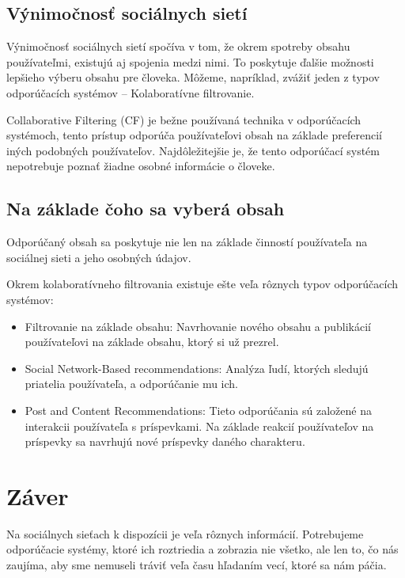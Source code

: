 \documentclass[10pt,twoside,slovak,a4paper]{article}
\begin{document}
\subsection{Výnimočnosť sociálnych sietí}

Výnimočnosť sociálnych sietí spočíva v tom, že okrem spotreby obsahu používateľmi, existujú aj spojenia medzi nimi. To poskytuje ďalšie možnosti lepšieho výberu obsahu pre človeka. Môžeme, napríklad, zvážiť jeden z typov odporúčacích systémov – Kolaboratívne filtrovanie.

Collaborative Filtering (CF) je bežne používaná technika v odporúčacích systémoch, tento prístup odporúča používateľovi obsah na základe preferencií iných podobných používateľov.\cite{dang03}
Najdôležitejšie je, že tento odporúčací systém nepotrebuje poznať žiadne osobné informácie o človeke.



\subsection{Na základe čoho sa vyberá obsah}

Odporúčaný obsah sa poskytuje nie len na základe činností používateľa na sociálnej sieti a jeho osobných údajov.

Okrem kolaboratívneho filtrovania existuje ešte veľa rôznych typov odporúčacích systémov:

\begin{itemize}
\item Filtrovanie na základe obsahu: Navrhovanie nového obsahu a publikácií používateľovi na základe obsahu, ktorý si už prezrel.
\item Social Network-Based recommendations: Analýza ľudí, ktorých sledujú priatelia používateľa, a odporúčanie mu ich.
\item Post and Content Recommendations: Tieto odporúčania sú založené na interakcii používateľa s príspevkami. Na základe reakcií používateľov na príspevky sa navrhujú nové príspevky daného charakteru.
\end{itemize}



\section{Záver} \label{zaver}

Na sociálnych sieťach k dispozícii je veľa rôznych informácií. Potrebujeme odporúčacie systémy, ktoré ich roztriedia a zobrazia nie všetko, ale len to, čo nás zaujíma, aby sme nemuseli tráviť veľa času hľadaním vecí, ktoré sa nám páčia.




\end{document}
